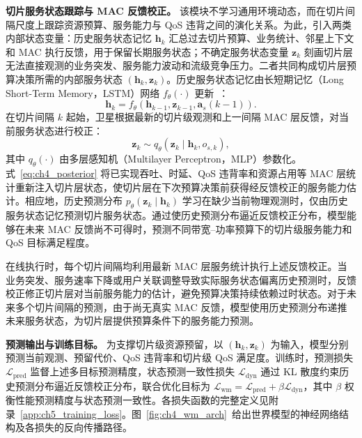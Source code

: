 \textbf{切片服务状态跟踪与 MAC 反馈校正。} 该模块不学习通用环境动态，而在切片间隔尺度上跟踪资源预算、服务能力与 QoS 违背之间的演化关系。为此，引入两类内部状态变量：历史服务状态记忆 $\boldsymbol h_k$ 汇总过去切片预算、业务统计、邻星上下文和 MAC 执行反馈，用于保留长期服务状态；不确定服务状态变量 $\boldsymbol z_k$ 刻画切片层无法直接观测的业务突发、服务能力波动和流级竞争压力。二者共同构成切片层预算决策所需的内部服务状态 $(\boldsymbol h_k,\boldsymbol z_k)$。历史服务状态记忆由长短期记忆（Long Short-Term Memory，LSTM）网络 $f_\theta(\cdot)$ 更新~\cite{Gong-SatTrafficPrediction-ICCC24}：
\begin{equation}\label{eq:ch4_memory}
\boldsymbol h_k=f_\theta\!\left(\boldsymbol h_{k-1},\boldsymbol z_{k-1},\mathbf a_s(k-1)\right).
\end{equation}
在切片间隔 $k$ 起始，卫星根据最新的切片级观测和上一间隔 MAC 层反馈，对当前服务状态进行校正：
\begin{equation}\label{eq:ch4_posterior}
\boldsymbol z_k\sim q_\theta(\boldsymbol z_k\mid\boldsymbol h_k,o_{s,k}),
\end{equation}
其中 $q_\theta(\cdot)$ 由多层感知机（Multilayer Perceptron，MLP）参数化。式~\eqref{eq:ch4_posterior} 将已实现吞吐、时延、QoS 违背率和资源占用等 MAC 层统计重新注入切片层状态，使切片层在下次预算决策前获得经反馈校正的服务能力估计。相应地，历史预测分布 $p_\theta(\boldsymbol z_k\mid\boldsymbol h_k)$ 学习在缺少当前物理观测时，仅由历史服务状态记忆预测切片服务状态。通过使历史预测分布逼近反馈校正分布，模型能够在未来 MAC 反馈尚不可得时，预测不同带宽--功率预算下的切片级服务能力和 QoS 目标满足程度。

在线执行时，每个切片间隔均利用最新 MAC 层服务统计执行上述反馈校正。当业务突发、服务速率下降或用户关联调整导致实际服务状态偏离历史预测时，反馈校正修正切片层对当前服务能力的估计，避免预算决策持续依赖过时状态。对于未来多个切片间隔的预测，由于尚无真实 MAC 反馈，模型使用历史预测分布递推未来服务状态，为切片层提供预算条件下的服务能力预测。

\textbf{预测输出与训练目标。} 为支撑切片级资源预留，以 $(\boldsymbol h_k,\boldsymbol z_k)$ 为输入，模型分别预测当前观测、预留代价、QoS 违背率和切片级 QoS 满足度。训练时，预测损失 $\mathcal L_{\mathrm{pred}}$ 监督上述多目标预测精度，状态预测一致性损失 $\mathcal L_{\mathrm{dyn}}$ 通过 KL 散度约束历史预测分布逼近反馈校正分布，联合优化目标为 $\mathcal L_{\mathrm{wm}}=\mathcal L_{\mathrm{pred}}+\beta\mathcal L_{\mathrm{dyn}}$，其中 $\beta$ 权衡性能预测精度与状态预测一致性。各损失函数的完整定义见附录~\ref{app:ch5_training_loss}。图~\ref{fig:ch4_wm_arch}~给出世界模型的神经网络结构及各损失的反向传播路径。

